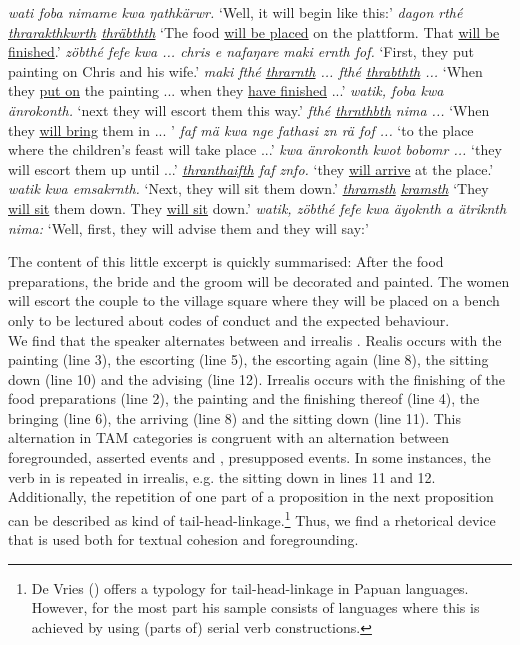 \begin{exe}
\ex
\begin{xlist}
	 \emph{wati foba nimame kwa ŋathkärwr.}
	\trans `Well, it will begin like this:'
	 \emph{dagon rthé \underline{thrarakthkwrth} \underline{thräbthth}}
	\trans `The food \underline{will be placed} on the plattform. That \underline{will be finished}.'
	 \emph{zöbthé fefe kwa ... chris e nafaŋare maki ernth fof.}
	\trans `First, they put painting on Chris and his wife.'
	 \emph{maki fthé \underline{thrarnth} ... fthé \underline{thrabthth} ...}
	\trans `When they \underline{put on} the painting ... when they \underline{have finished} ...'
	 \emph{watik, foba kwa änrokonth.}
	\trans `next they will escort them this way.'
	 \emph{fthé \underline{thrnthbth} nima ...}
	\trans `When they \underline{will bring} them in ... '
	 \emph{faf mä kwa nge fathasi zn rä fof ...}
	\trans `to the place where the children's feast will take place ...'
	 \emph{kwa änrokonth kwot bobomr ...}
	\trans `they will escort them up until ...'
	 \emph{\underline{thranthaifth} faf znfo.}
	\trans `they \underline{will arrive} at the place.'
	 \emph{watik kwa emsakrnth.}
	\trans `Next, they will sit them down.'
	 \emph{\underline{thramsth} \underline{kramsth}}
	\trans `They \underline{will sit} them down. They \underline{will sit} down.'
	 \emph{watik, zöbthé fefe kwa äyoknth a ätriknth nima:}
	\trans `Well, first, they will advise them and they will say:'
\end{xlist}
\label{fathasitext}
\end{exe}

The content of this little excerpt is quickly summarised: After the food preparations, the bride and the groom will be decorated and painted. The women will escort the couple to the village square where they will be placed on a bench only to be lectured about codes of conduct and the expected behaviour.\\

We find that the speaker alternates between  and irrealis . Realis occurs with the painting (line 3), the escorting (line 5), the escorting again (line 8), the sitting down (line 10) and the advising (line 12). Irrealis occurs with the finishing of the food preparations (line 2), the painting and the finishing thereof (line 4), the bringing (line 6), the arriving (line 8) and the sitting down (line 11). This alternation in TAM categories is congruent with an alternation between foregrounded, asserted events and , presupposed events. In some instances, the verb in  is repeated in irrealis, e.g. the sitting down in lines 11 and 12. Additionally, the repetition of one part of a proposition in the next proposition can be described as kind of tail-head-linkage.\footnote{De Vries (\citeyear{deVries:2005tm}) offers a typology for tail-head-linkage in Papuan languages. However, for the most part his sample consists of languages where this is achieved by using (parts of) serial verb constructions.} Thus, we find a rhetorical device that is used both for textual cohesion and foregrounding.\\

